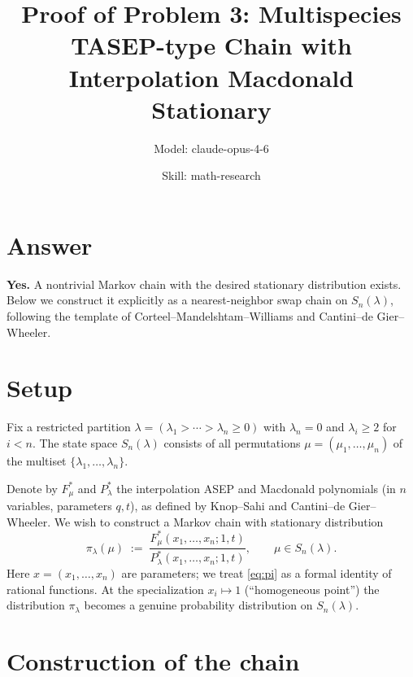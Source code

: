 

\title{Proof of Problem 3: Multispecies TASEP-type Chain with Interpolation Macdonald Stationary}
\author{Model: claude-opus-4-6 \and Skill: math-research}
\date{}

\newtheorem{theorem}{Theorem}
\newtheorem{lemma}[theorem]{Lemma}
\newtheorem{proposition}[theorem]{Proposition}


\maketitle

\section*{Answer}

\textbf{Yes.} A nontrivial Markov chain with the desired stationary distribution exists. Below we construct it explicitly as a nearest-neighbor swap chain on $S_n(\lambda)$, following the template of Corteel--Mandelshtam--Williams and Cantini--de Gier--Wheeler.

\section{Setup}

Fix a restricted partition $\lambda=(\lambda_1>\cdots>\lambda_n\geq 0)$ with $\lambda_n=0$ and $\lambda_i\geq 2$ for $i<n$. The state space $S_n(\lambda)$ consists of all permutations $\mu=(\mu_1,\dots,\mu_n)$ of the multiset $\{\lambda_1,\dots,\lambda_n\}$.

Denote by $F^*_\mu$ and $P^*_\lambda$ the interpolation ASEP and Macdonald polynomials (in $n$ variables, parameters $q,t$), as defined by Knop--Sahi and Cantini--de Gier--Wheeler. We wish to construct a Markov chain with stationary distribution
\begin{equation}\label{eq:pi}
   \pi_\lambda(\mu) \;:=\; \frac{F^*_\mu(x_1,\dots,x_n;1,t)}{P^*_\lambda(x_1,\dots,x_n;1,t)}, \qquad \mu\in S_n(\lambda).
\end{equation}
Here $x=(x_1,\dots,x_n)$ are parameters; we treat \eqref{eq:pi} as a formal identity of rational functions. At the specialization $x_i\mapsto 1$ (``homogeneous point'') the distribution $\pi_\lambda$ becomes a genuine probability distribution on $S_n(\lambda)$.

\section{Construction of the chain}

